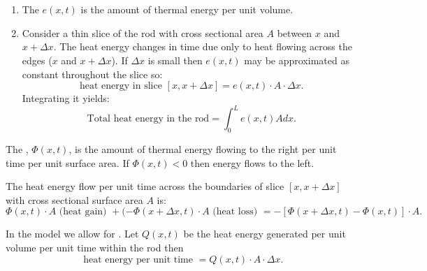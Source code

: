 \documentclass[class=article,crop=false]{standalone}
\begin{document}
~\begin{defn}
~\begin{enumerate}[label=\arabic*)]
	\item The  $ e(x,t)$ is the amount of thermal energy per unit volume.
	\item Consider a thin slice of the rod with cross sectional area  $ A$ between  $ x$ and  $ x+ \Delta x$. The heat energy changes in time due only to heat flowing across the edges ($ x$ and  $ x+\Delta x$). If $ \Delta x$ is small then $ e(x,t)$ may be approximated as constant throughout the slice so:
		 \[
			 \text{ heat energy in slice }[x,x+\Delta x] = e(x,t) \cdot A \cdot \Delta x
		.\] 
		Integrating it yields:
		\[
			\text{ Total heat energy in the rod} = \int_{ 0}^{ L} e(x,t) A dx  
		.\] 
\end{enumerate}

\end{defn}
\begin{defn}
	The , $ \Phi(x,t)$, is the amount of thermal energy flowing to the right per unit time per unit surface area. If $ \Phi(x,t)<0$ then energy flows to the left. 
\end{defn}

The heat energy flow per unit time across the boundaries of slice $ [x,x+\Delta x]$ with cross sectional surface area $ A$ is:
 \[
	 \Phi(x,t) \cdot A \text{ (heat gain) } + (-\Phi(x+\Delta x,t) \cdot A \text{ (heat loss) }  = -[\Phi(x+\Delta x,t) - \Phi(x,t)] \cdot A
.\] 

\begin{defn}[]
	In the model we allow for . Let $ Q(x,t)$ be the heat energy generated per unit volume  per unit time within the rod then
	\[
		\text{ heat energy per unit time } = Q(x,t) \cdot  A \cdot \Delta x 
	.\] 
\end{defn}
\end{document}
